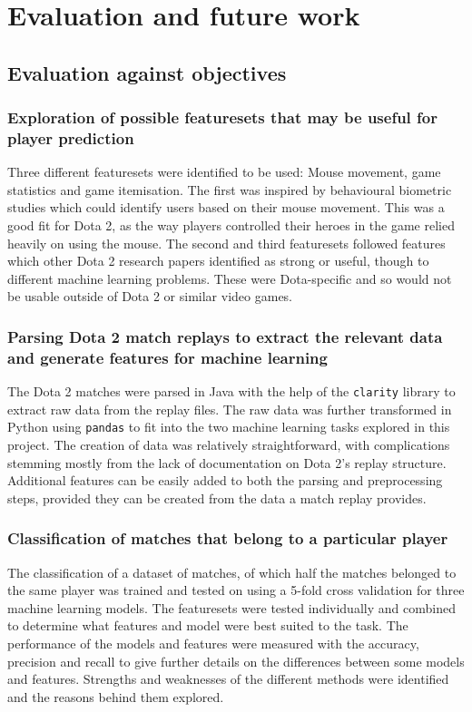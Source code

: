 \documentclass[Report.tex]{subfiles}
\begin{document}
\section{Evaluation and future work}

\subsection{Evaluation against objectives}
\subsubsection{Exploration of possible featuresets that may be useful for player prediction}
Three different featuresets were identified to be used: Mouse movement, game statistics and game itemisation. The first was inspired by behavioural biometric studies which could identify users based on their mouse movement. This was a good fit for Dota 2, as the way players controlled their heroes in the game relied heavily on using the mouse. The second and third featuresets followed features which other Dota 2 research papers identified as strong or useful, though to different machine learning problems. These were Dota-specific and so would not be usable outside of Dota 2 or similar video games. 

\subsubsection{Parsing Dota 2 match replays to extract the relevant data and generate features for machine learning}
The Dota 2 matches were parsed in Java with the help of the \texttt{clarity} library to extract raw data from the replay files. The raw data was further transformed in Python using \texttt{pandas} to fit into the two machine learning tasks explored in this project. The creation of data was relatively straightforward, with complications stemming mostly from the lack of documentation on Dota 2's replay structure. Additional features can be easily added to both the parsing and preprocessing steps, provided they can be created from the data a match replay provides.

\subsubsection{Classification of matches that belong to a particular player}
The classification of a dataset of matches, of which half the matches belonged to the same player was trained and tested on using a 5-fold cross validation for three machine learning models. The featuresets were tested individually and combined to determine what features and model were best suited to the task. The performance of the models and features were measured with the accuracy, precision and recall to give further details on the differences between some models and features. Strengths and weaknesses of the different methods were identified and the reasons behind them explored. 
\end{document}
